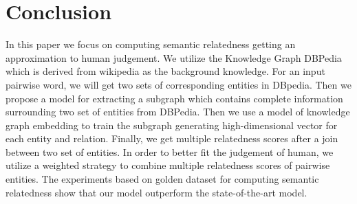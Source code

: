 \section{Conclusion}
In this paper we focus on computing semantic relatedness getting an approximation to human judgement.
We utilize the Knowledge Graph DBPedia which is derived from wikipedia as the background knowledge.
For an input pairwise word, we will get two sets of corresponding entities in DBpedia.
Then we propose a model for extracting a subgraph which contains complete information surrounding two set of entities from DBPedia.
Then we use a model of knowledge graph embedding to train the subgraph generating high-dimensional vector for each entity and relation. 
Finally, we get multiple relatedness scores after a join between two set of entities.
In order to better fit the judgement of human, we utilize a weighted strategy to combine
multiple relatedness scores of pairwise entities.
The experiments based on golden dataset for computing semantic relatedness show
that our model outperform the state-of-the-art model.
